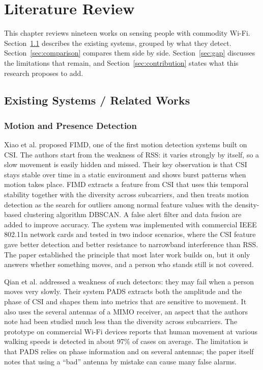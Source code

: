 \chapter{Literature Review}
This chapter reviews nineteen works on sensing people with commodity Wi-Fi. Section~\ref{sec:related} describes the existing systems, grouped by what they detect. Section~\ref{sec:comparison} compares them side by side. Section~\ref{sec:gap} discusses the limitations that remain, and Section~\ref{sec:contribution} states what this research proposes to add.

\section{Existing Systems / Related Works}
\label{sec:related}

\subsection{Motion and Presence Detection}
Xiao et al. \cite{fimd} proposed FIMD, one of the first motion detection systems built on CSI. The authors start from the weakness of RSS: it varies strongly by itself, so a slow movement is easily hidden and missed. Their key observation is that CSI stays stable over time in a static environment and shows burst patterns when motion takes place. FIMD extracts a feature from CSI that uses this temporal stability together with the diversity across subcarriers, and then treats motion detection as the search for outliers among normal feature values with the density-based clustering algorithm DBSCAN. A false alert filter and data fusion are added to improve accuracy. The system was implemented with commercial IEEE 802.11n network cards and tested in two indoor scenarios, where the CSI feature gave better detection and better resistance to narrowband interference than RSS. The paper established the principle that most later work builds on, but it only answers whether something moves, and a person who stands still is not covered.

Qian et al. \cite{pads} addressed a weakness of such detectors: they may fail when a person moves very slowly. Their system PADS extracts both the amplitude and the phase of CSI and shapes them into metrics that are sensitive to movement. It also uses the several antennas of a MIMO receiver, an aspect that the authors note had been studied much less than the diversity across subcarriers. The prototype on commercial Wi-Fi devices reports that human movement at various walking speeds is detected in about 97\% of cases on average. The limitation is that PADS relies on phase information and on several antennas; the paper itself notes that using a ``bad'' antenna by mistake can cause many false alarms.

